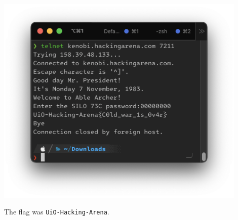 \begin{center}
    \includegraphics[width=12cm]{img/Get in touch with services/Minuteman/Skjermbilde 2023-10-26 kl. 15.13.55.png}
\end{center}

The flag was \texttt{UiO-Hacking-Arena}.